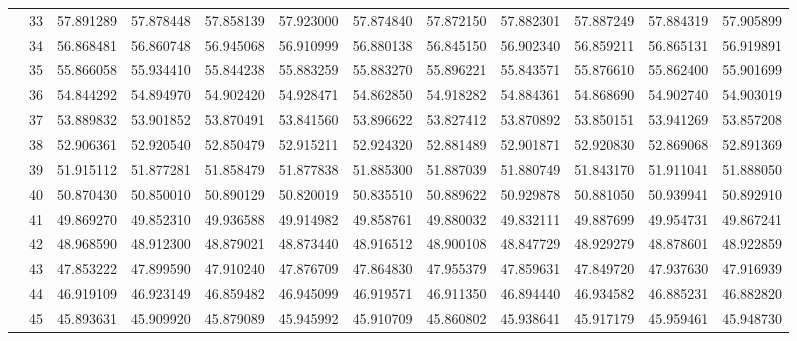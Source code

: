 \begin{table}[h]
{\begin{tabular}{cc|cccccccccc}
\multicolumn{1}{|c|}{} & 33 & 57.891289 & 57.878448 & 57.858139 & 57.923000 & 57.874840 & 57.872150 & 57.882301 & 57.887249 & 57.884319 & 57.905899 \\ \cline{2-2}
\multicolumn{1}{|c|}{} & 34 & 56.868481 & 56.860748 & 56.945068 & 56.910999 & 56.880138 & 56.845150 & 56.902340 & 56.859211 & 56.865131 & 56.919891 \\ \cline{2-2}
\multicolumn{1}{|c|}{} & 35 & 55.866058 & 55.934410 & 55.844238 & 55.883259 & 55.883270 & 55.896221 & 55.843571 & 55.876610 & 55.862400 & 55.901699 \\ \cline{2-2}
\multicolumn{1}{|c|}{} & 36 & 54.844292 & 54.894970 & 54.902420 & 54.928471 & 54.862850 & 54.918282 & 54.884361 & 54.868690 & 54.902740 & 54.903019 \\ \cline{2-2}
\multicolumn{1}{|c|}{} & 37 & 53.889832 & 53.901852 & 53.870491 & 53.841560 & 53.896622 & 53.827412 & 53.870892 & 53.850151 & 53.941269 & 53.857208 \\ \cline{2-2}
\multicolumn{1}{|c|}{} & 38 & 52.906361 & 52.920540 & 52.850479 & 52.915211 & 52.924320 & 52.881489 & 52.901871 & 52.920830 & 52.869068 & 52.891369 \\ \cline{2-2}
\multicolumn{1}{|c|}{} & 39 & 51.915112 & 51.877281 & 51.858479 & 51.877838 & 51.885300 & 51.887039 & 51.880749 & 51.843170 & 51.911041 & 51.888050 \\ \cline{2-2}
\multicolumn{1}{|c|}{} & 40 & 50.870430 & 50.850010 & 50.890129 & 50.820019 & 50.835510 & 50.889622 & 50.929878 & 50.881050 & 50.939941 & 50.892910 \\ \cline{2-2}
\multicolumn{1}{|c|}{} & 41 & 49.869270 & 49.852310 & 49.936588 & 49.914982 & 49.858761 & 49.880032 & 49.832111 & 49.887699 & 49.954731 & 49.867241 \\ \cline{2-2}
\multicolumn{1}{|c|}{} & 42 & 48.968590 & 48.912300 & 48.879021 & 48.873440 & 48.916512 & 48.900108 & 48.847729 & 48.929279 & 48.878601 & 48.922859 \\ \cline{2-2}
\multicolumn{1}{|c|}{} & 43 & 47.853222 & 47.899590 & 47.910240 & 47.876709 & 47.864830 & 47.955379 & 47.859631 & 47.849720 & 47.937630 & 47.916939 \\ \cline{2-2}
\multicolumn{1}{|c|}{} & 44 & 46.919109 & 46.923149 & 46.859482 & 46.945099 & 46.919571 & 46.911350 & 46.894440 & 46.934582 & 46.885231 & 46.882820 \\ \cline{2-2}
\multicolumn{1}{|c|}{} & 45 & 45.893631 & 45.909920 & 45.879089 & 45.945992 & 45.910709 & 45.860802 & 45.938641 & 45.917179 & 45.959461 & 45.948730 \\ \cline{2-2}

\end{tabular}}
\end{table}
